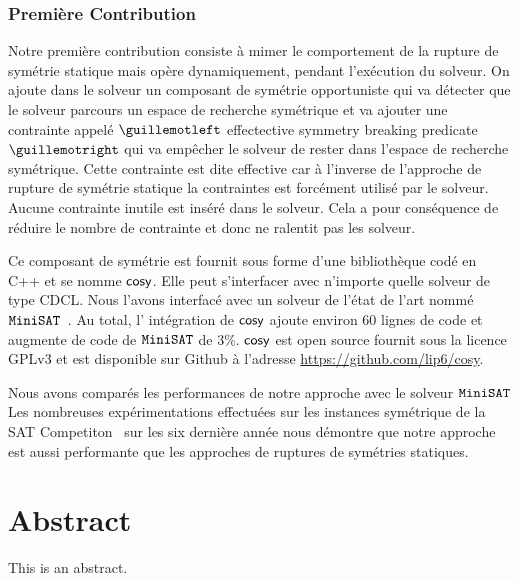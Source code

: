 \subsection{Première Contribution}

Notre première contribution consiste à mimer le comportement de la rupture de symétrie statique mais 
opère dynamiquement, pendant l'exécution du solveur. On ajoute dans le solveur un composant de symétrie opportuniste qui va détecter que le solveur parcours un espace de recherche symétrique et va ajouter
une contrainte appelé $\guillemotleft$ effectective symmetry breaking predicate $\guillemotright$ qui va empêcher le solveur de rester dans
l'espace de recherche symétrique. Cette contrainte est dite effective car à l'inverse de l'approche 
de rupture de symétrie  statique la contraintes est forcément utilisé par le solveur. Aucune contrainte
inutile est inséré dans le solveur. Cela a pour conséquence de réduire le nombre de contrainte et donc 
ne ralentit pas les solveur.

Ce composant de symétrie est fournit sous forme d'une bibliothèque codé en C++ et se nomme $\textsf{cosy}$.
Elle peut s'interfacer avec n'importe quelle solveur de type CDCL. 
Nous l'avons interfacé avec un solveur de l'état de l'art nommé $\texttt{MiniSAT}$~\cite{een2003extensible}. Au total, l' intégration de $\textsf{cosy}$ ajoute environ 60 lignes de code 
et augmente de code de $\texttt{MiniSAT}$ de 3\%.
$\textsf{cosy}$ est open source fournit sous la licence GPLv3 et est disponible sur Github à l'adresse \url{https://github.com/lip6/cosy}.


Nous avons comparés les performances de notre approche avec le solveur $\texttt{MiniSAT}$
Les nombreuses expérimentations effectuées sur les instances symétrique de la SAT Competiton~\cite{jarvisalo2012international} sur les six dernière année nous démontre que notre approche est aussi performante que les approches de ruptures de symétries statiques.


\chapter*{Abstract}

This is an abstract.